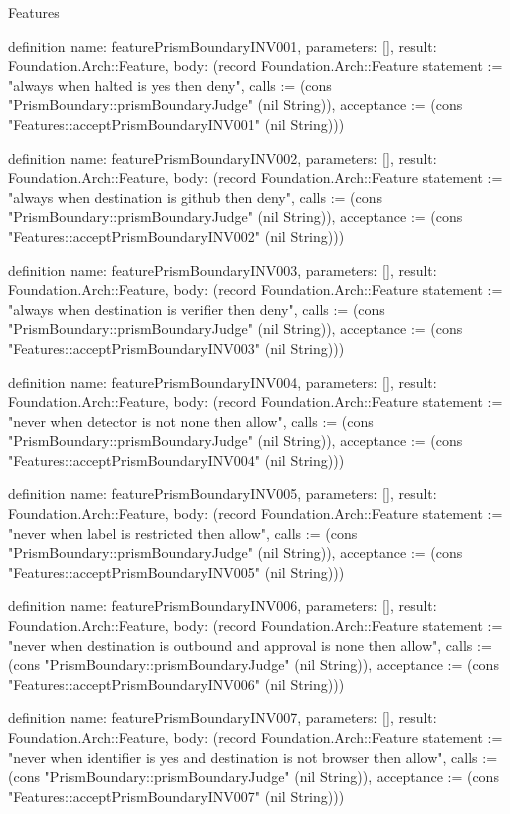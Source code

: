 \begin{lexlean}{Features}
\begin{semanticmodule}
definition{
  name: featurePrismBoundaryINV001,
  parameters: [],
  result: Foundation.Arch::Feature,
  body: (record Foundation.Arch::Feature {statement := "always when halted is yes then deny", calls := (cons "PrismBoundary::prismBoundaryJudge" (nil String)), acceptance := (cons "Features::acceptPrismBoundaryINV001" (nil String))})
}

definition{
  name: featurePrismBoundaryINV002,
  parameters: [],
  result: Foundation.Arch::Feature,
  body: (record Foundation.Arch::Feature {statement := "always when destination is github then deny", calls := (cons "PrismBoundary::prismBoundaryJudge" (nil String)), acceptance := (cons "Features::acceptPrismBoundaryINV002" (nil String))})
}

definition{
  name: featurePrismBoundaryINV003,
  parameters: [],
  result: Foundation.Arch::Feature,
  body: (record Foundation.Arch::Feature {statement := "always when destination is verifier then deny", calls := (cons "PrismBoundary::prismBoundaryJudge" (nil String)), acceptance := (cons "Features::acceptPrismBoundaryINV003" (nil String))})
}

definition{
  name: featurePrismBoundaryINV004,
  parameters: [],
  result: Foundation.Arch::Feature,
  body: (record Foundation.Arch::Feature {statement := "never when detector is not none then allow", calls := (cons "PrismBoundary::prismBoundaryJudge" (nil String)), acceptance := (cons "Features::acceptPrismBoundaryINV004" (nil String))})
}

definition{
  name: featurePrismBoundaryINV005,
  parameters: [],
  result: Foundation.Arch::Feature,
  body: (record Foundation.Arch::Feature {statement := "never when label is restricted then allow", calls := (cons "PrismBoundary::prismBoundaryJudge" (nil String)), acceptance := (cons "Features::acceptPrismBoundaryINV005" (nil String))})
}

definition{
  name: featurePrismBoundaryINV006,
  parameters: [],
  result: Foundation.Arch::Feature,
  body: (record Foundation.Arch::Feature {statement := "never when destination is outbound and approval is none then allow", calls := (cons "PrismBoundary::prismBoundaryJudge" (nil String)), acceptance := (cons "Features::acceptPrismBoundaryINV006" (nil String))})
}

definition{
  name: featurePrismBoundaryINV007,
  parameters: [],
  result: Foundation.Arch::Feature,
  body: (record Foundation.Arch::Feature {statement := "never when identifier is yes and destination is not browser then allow", calls := (cons "PrismBoundary::prismBoundaryJudge" (nil String)), acceptance := (cons "Features::acceptPrismBoundaryINV007" (nil String))})
}


\end{semanticmodule}
\end{lexlean}
